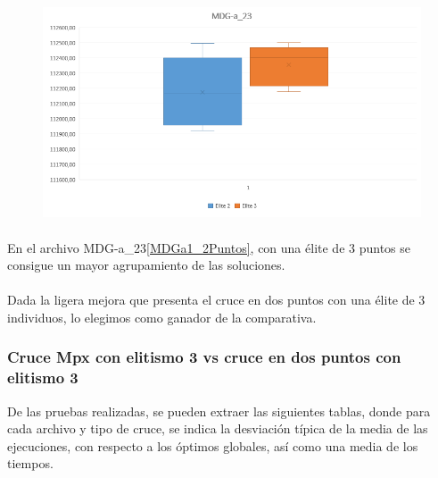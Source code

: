 	\begin{figure}[H]
		\centering
		\includegraphics[scale=0.65]{img/2point_2vs3/MDG3}
		\caption{}
		\label{MDGa3_2Puntos}
		
	\end{figure}

	\paragraph{}En el archivo MDG-a\_23\ref{MDGa1_2Puntos}, con una élite de 3 puntos se consigue un mayor agrupamiento de las soluciones.
		
	\paragraph{}Dada la ligera mejora que presenta el cruce en dos puntos con una élite de 3 individuos, lo elegimos como ganador de la comparativa.
	
	\subsubsection{Cruce Mpx con elitismo 3 vs cruce en dos puntos con elitismo 3} De las pruebas realizadas, se pueden extraer las siguientes tablas, donde para cada archivo y tipo de cruce, se indica la desviación típica de la media de las ejecuciones, con respecto a los óptimos globales, así como una media de los tiempos. 
	
